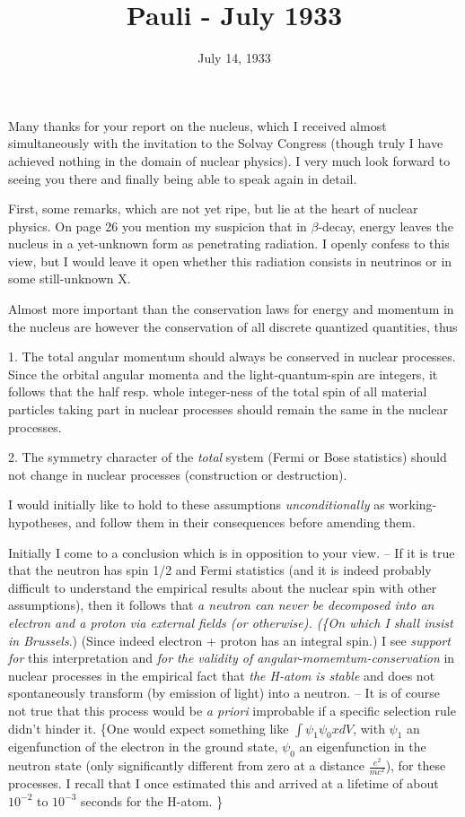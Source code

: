 \documentclass{article}
\title{Pauli - July 1933}
\begin{document}
\date{July 14, 1933}

Many thanks for your report on the nucleus, which I received almost simultaneously with the invitation to the Solvay Congress (though truly I have achieved nothing in the domain of nuclear physics). I very much look forward to seeing you there and finally being able to speak again in detail.

First, some remarks, which are not yet ripe, but lie at the heart of nuclear physics. On page 26 you mention my suspicion that in $\beta$-decay, energy leaves the nucleus in a yet-unknown form as penetrating radiation. I openly confess to this view, but I would leave it open whether this radiation consists in neutrinos or in some still-unknown X.

Almost more important than the conservation laws for energy and momentum in the nucleus are however the conservation of all discrete quantized quantities, thus

1. The total angular momentum should always be conserved in nuclear processes. Since the orbital angular momenta and the light-quantum-spin are integers, it follows that the half resp. whole integer-ness of the total spin of all material particles taking part in nuclear processes should remain the same in the nuclear processes.

2. The symmetry character of the \textit{total} system (Fermi or Bose statistics) should not change in nuclear processes (construction or destruction).

I would initially like to hold to these assumptions \textit{unconditionally} as working-hypotheses, and follow them in their consequences before amending them.

Initially I come to a conclusion which is in opposition to your view. -- If it is true that the neutron has spin 1/2 and Fermi statistics (and it is indeed probably difficult to understand the empirical results about the nuclear spin with other assumptions), then it follows that \textit{a neutron can never be decomposed into an electron and a proton via external fields (or otherwise). (\{On which I shall insist in Brussels}.) (Since indeed electron + proton has an integral spin.) I see \textit{support for} this interpretation and \textit{for the validity of angular-momemtum-conservation} in nuclear processes in the empirical fact that \textit{the H-atom is stable} and does not spontaneously transform (by emission of light) into a neutron. -- It is of course not true that this process would be \textit{a priori} improbable if a specific selection rule didn't hinder it. \{One would expect something like $\int{\psi_1 \psi_0 x {dV}}$, with $\psi_1$ an eigenfunction of the electron in the ground state, $\psi_0$ an eigenfunction in the neutron state (only significantly different from zero at a distance $\frac{e^2}{mc^2}$), for these processes. I recall that I once estimated this and arrived at a lifetime of about $10^{-2}$ to $10^{-3}$ seconds for the H-atom. \}
\end{document}
